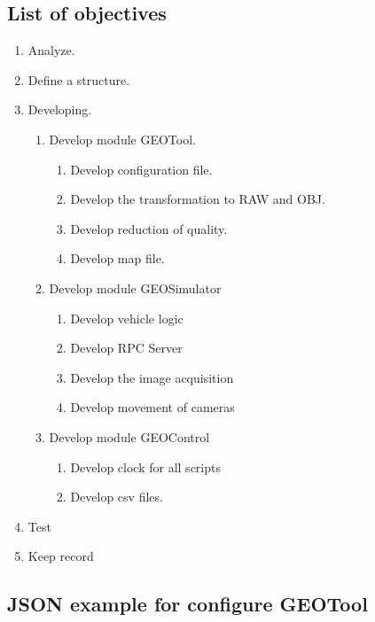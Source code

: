 \documentclass[10pt,a4paper,twocolumn,twoside]{article}
\begin{document}
\subsection{List of objectives}
\label{appendix:objectives}
\begin{enumerate}
  \item Analyze.
  \item Define a structure.
  \item Developing.
  \begin{enumerate}
    \item Develop module GEOTool.
    \begin{enumerate}
		\item Develop configuration file.
		\item Develop the transformation to RAW and OBJ.
		\item Develop reduction of quality.
		\item Develop map file.
  	\end{enumerate}
  	
    \item Develop module GEOSimulator
    \begin{enumerate}
	  	\item Develop vehicle logic
	  	\item Develop RPC Server
	  	\item Develop the image acquisition
	  	\item Develop movement of cameras
  	\end{enumerate}
  	
  	\item Develop module GEOControl
	 \begin{enumerate}
	  	\item Develop clock for all scripts
	  	\item Develop csv files.
  	\end{enumerate}  	
  	
  \end{enumerate}
  
  \item Test
  \item Keep record
\end{enumerate}

\subsection{JSON example for configure GEOTool}
\label{appendix:geotoolconfig}

\end{document}
